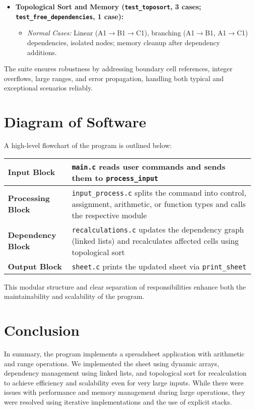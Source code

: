 \documentclass[12pt,letterpaper,onecolumn]{exam}
\begin{document}
\begin{itemize}
    \item \textbf{Topological Sort and Memory (\texttt{test\_toposort}, 3 cases; \texttt{test\_free\_dependencies}, 1 case):}
    \begin{itemize}
        \item \textit{Normal Cases:} Linear (A1$\rightarrow$B1$\rightarrow$C1), branching (A1$\rightarrow$B1, A1$\rightarrow$C1) dependencies, isolated nodes; memory cleanup after dependency additions.
    \end{itemize}
\end{itemize}

The suite ensures robustness by addressing boundary cell references, integer overflows, large ranges, and error propagation, handling both typical and exceptional scenarios reliably.
\section{Diagram of Software}

A high-level flowchart of the program is outlined below:

\begin{center}
\begin{tabularx}{\textwidth}{|X|X|}
    \hline
    \textbf{Input Block} & \texttt{main.c} reads user commands and sends them to \texttt{process\_input} \\
    \hline
    \textbf{Processing Block} & \texttt{input\_process.c} splits the command into control, assignment, arithmetic, or function types and calls the respective module \\
    \hline
    \textbf{Dependency Block} & \texttt{recalculations.c} updates the dependency graph (linked lists) and recalculates affected cells using topological sort \\
    \hline
    \textbf{Output Block} & \texttt{sheet.c} prints the updated sheet via \texttt{print\_sheet} \\
    \hline
\end{tabularx}
\end{center}

This modular structure and clear separation of responsibilities enhance both the maintainability and scalability of the program.

\section{Conclusion}

In summary, the program implements a spreadsheet application with arithmetic and range operations. We implemented the sheet using dynamic arrays, dependency management using linked lists, and topological sort for recalculation to achieve efficiency and scalability even for very large inputs. While there were issues with performance and memory management during large operations, they were resolved using iterative implementations and the use of explicit stacks.
\end{document}
